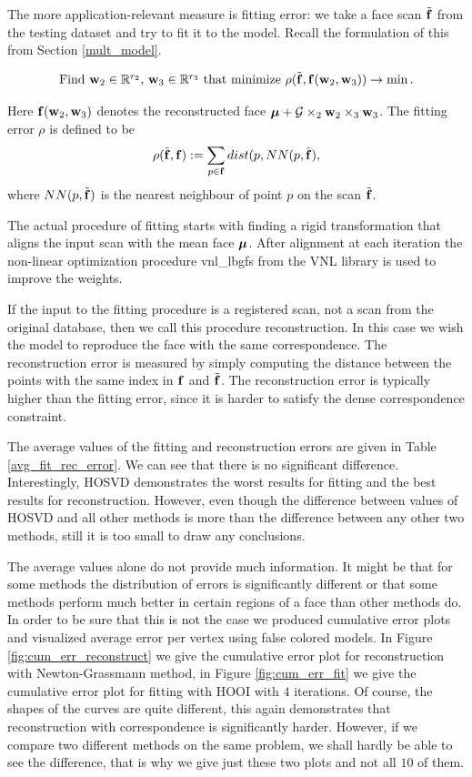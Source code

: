 The more application-relevant measure is fitting error: we take a face scan $\tilde{{\mathbf{f}}}$
from the testing dataset and try to fit it to the model. Recall the formulation of this from Section \ref{mult_model}.

\begin{equation}
\mbox{Find ${\mathbf{w}}_2 \in \mathbb{R}^{r_2}$, ${\mathbf{w}}_3 \in \mathbb{R}^{r_3}$ that minimize } \rho(\tilde{{\mathbf{f}}}, {\mathbf{f}}({\mathbf{w}}_2, {\mathbf{w}}_3)) \to \min.
\end{equation}

Here ${\mathbf{f}}({\mathbf{w}}_2, {\mathbf{w}}_3)$ denotes the reconstructed face ${\boldsymbol{\mu}} + \mathcal{G} \times_2 {\mathbf{w}}_2 \times_3 {\mathbf{w}}_3$. The fitting error
$\rho$ is defined to be
\begin{equation}
\rho(\tilde{{\mathbf{f}}}, {\mathbf{f}}) := \sum_{ p \in {\mathbf{f}} } dist(p, NN(p, \tilde{{\mathbf{f}}}),
\end{equation}
where $NN(p, {\tilde{\mathbf{f}}})$ is the nearest neighbour of point $p$ on the scan ${\tilde{\mathbf{f}}}$. 


The actual procedure of fitting starts with finding a rigid transformation
that aligns the input scan with the mean face ${\boldsymbol{\mu}}$. After alignment
at each iteration the non-linear optimization procedure \textrm{vnl\_lbgfs} from the VNL library
is used to improve the weights.



If the input to the fitting procedure is a registered scan, not a scan from the original
database, then we call this procedure reconstruction. In this case
we wish the model to reproduce the face with the same correspondence. The reconstruction
error is measured by simply computing the distance between the points with the same
index in ${\mathbf{f}}$ and ${\tilde{\mathbf{f}}}$. The reconstruction error is typically higher than the 
fitting error, since it is harder to satisfy the dense correspondence constraint.


The average values of the fitting and reconstruction errors are given in Table \ref{avg_fit_rec_error}.
We can see that there is no significant difference. Interestingly, HOSVD demonstrates
the worst results for fitting and the best results for reconstruction. However,
even though the difference between values of HOSVD and all other methods is more than the difference
between any other two methods, still it is too small to draw any conclusions.



The average values alone do not provide much information. It might be that for some methods
the distribution of errors is significantly different or that some methods perform much better
in certain regions of a face than other methods do. In order to be sure that this is not the case
we produced cumulative error plots and visualized average error per vertex using false colored models.
In Figure \ref{fig:cum_err_reconstruct}
we give the cumulative error plot for reconstruction with Newton-Grassmann method, in Figure \ref{fig:cum_err_fit}
we give the cumulative error plot for fitting with HOOI with $4$ iterations. Of course, the shapes of the curves are quite different, this again demonstrates that reconstruction with correspondence is significantly harder.
However, if we compare two different methods on the same problem, we shall hardly be able to see the difference, 
that is why we give just these two plots and not all $10$ of them.


